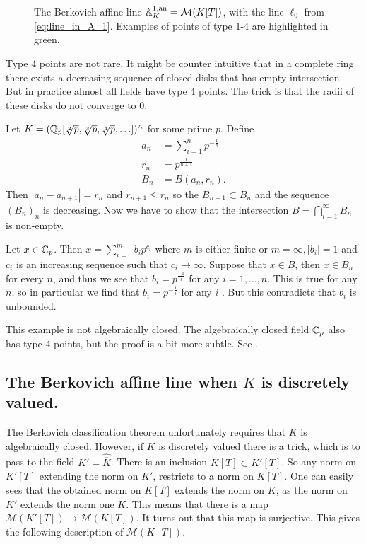 \begin{figure}[h]
    \centering
	\caption{The Berkovich affine line $\mathbb{A}_K^{1, \text{an}} = \mathcal{M} (K[T])$, with the line $\ell_0$ from \cref{eq:line_in_A_1}. 
	Examples of points of type 1-4 are highlighted in green.}
	\label{fig:affine_line}
\end{figure}
Type 4 points are not rare. It might be counter intuitive that in a complete ring there exists a decreasing sequence of closed disks that has empty intersection. 
But in practice almost all fields have type  4 points. 
The trick is that the radii of these disks do not converge to $0$. 
\begin{example}\label{ex:type4point}
	Let $K = (\mathbb{Q}_p[\sqrt[2]{p} ,\sqrt[3]{p}, \sqrt[4]{p},\ldots])^{\wedge}  $ for some prime $p$. 
	Define 
	\begin{align*}
		a_n &= \sum_{i = 1}^{n} p^{-\frac{1}{n}}\\
		r_n &= p^{\frac{1}{n + 1}} \\
		B_n &= B(a_n, r_n) 
.\end{align*}
Then $|a_n - a_{n + 1}| = r_n$ and $r_{n + 1} \le r_n$ so the $B_{n + 1} \subset B_n$ and the sequence $(B_n)_n$ is decreasing. 
Now we have to show that the intersection $B = \bigcap_{i = 1} ^{\infty} B_n$ is non-empty. 

Let $x \in \mathbb{C}_p$. Then $x = \sum_{i = 0}^{m} b_i p^{c_i}$ where $m$ is either finite or $m = \infty, |b_i| = 1$ and $c_i$ is an increasing sequence such that $c_i \to \infty $. Suppose that  $x \in B$, then $x \in B_n$ for every $n$, and thus we see that  $b_i = p^{\frac{-1}{i}}$ for any $i = 1, \ldots, n$.  
This is true for any $n $, so in particular we find that $b_i = p^{-\frac{1}{i}}$ for any $i$ .
But this contradicts that $b_i$ is unbounded. 

This example is not algebraically closed.  
The algebraically closed field $\mathbb{C}_p$ also has type 4 points, but the proof is a bit more subtle. See \cite[][sec. 3.4]{robertCoursePadicAnalysis2000}.
\end{example}

\subsection{The Berkovich affine line when $K$ is discretely valued.} \label{sec:the_berkovich_affine_line_when_k_is_discretely_valued.}
The Berkovich classification theorem unfortunately requires that $K$ is algebraically closed. 
However, if $K$ is discretely valued there is a trick, which is to pass to the field $K' = \hat{\overline{K}}$. 
There is an inclusion $K[T] \subset  K'[T]$. 
So any norm on $K'[T]$ extending the norm on $K'$, restricts to a norm on $K[T]$. 
One can easily sees that the obtained norm on $K[T]$ extends the norm on  $K$, as the norm on $K'$ extends the norm one $K$. 
This means that there is a map $\mathcal{M} \left(K'[T]\right) \to \mathcal{M} (K[T])$. 
It turns out that this map is surjective. 
This gives the following description of $\mathcal{M} (K[T])$.


